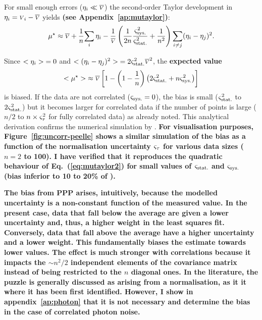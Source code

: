 \documentclass{pasa}
\def\correction#1{{\bfseries #1}}
\begin{document}
For small enough errors ($\eta_i \ll \overline{{\scriptstyle V}}$) the second-order Taylor development in $\eta_i = {\scriptstyle V}_i - \overline{{\scriptstyle V}}$ yields \correction{(see Appendix~\ref{ap:mutaylor})}: 
\begin{equation}
    \mu^\star \approx 
        \overline{{\scriptstyle V}}
      + \frac1n {\sum\limits_i \eta_i}
      - \frac 1{\overline{{\scriptstyle V}}} 
        \left(\frac1{2n}\frac{\varsigma_\text{sys.}^2}{\varsigma_\text{stat.}^2}  + \frac 1{n^2}\right) 
      \sum\limits_{i\ne j} (\eta_i-\eta_j)^2.
    \label{eq:mutaylor}
\end{equation}

Since $ {<\eta_i>}  = 0$ and $ {<(\eta_i-\eta_j)^2>}  = 2\varsigma_\text{stat.}^2\overline{{\scriptstyle V}}^2$, the \correction{expected value}
\begin{equation}
     {<\ensuremath{\mu}^\star>}   \approx \overline{{\scriptstyle V}} 
            \left[ 1 -  
               \left(1-\frac1n\right)
               \left(2\varsigma_\text{stat.}^2 + n\varsigma_\text{sys.}^2\right)
               \right]
    \label{eq:mutaylor2}
\end{equation}
is biased.  If the data are not correlated ($\varsigma_\text{sys.} = 0$), the bias is small
($\varsigma_\text{stat.}^2$ to $2\varsigma_\text{stat.}^2$) but it becomes larger for correlated data if the number of points is large ($n/2$ to $n \times \varsigma_\tau^2$ for fully correlated data) as \citet{DAG94} already noted. This analytical derivation confirms the numerical simulation by \citet[][see their Fig.~4]{NEU12}. \correction{For visualisation purposes, Figure~\ref{fig:uncorr-peelle} shows a similar simulation of the bias as a function of the normalisation uncertainty $\varsigma_\tau$ for various data sizes ($n = 2$ to 100). I have verified that it reproduces the quadratic behaviour of Eq.~(\ref{eq:mutaylor2}) for small values of $\varsigma_\text{stat.}$ and $\varsigma_\text{sys.}$ (bias inferior to 10 to 20\% of \datamean).}

\correction{The bias from PPP arises, intuitively, because the modelled uncertainty is a non-constant function of the measured value. In the present case, data that fall below the average are given a lower uncertainty and, thus, a higher weight in the least squares fit. Conversely, data that fall above the average have a higher uncertainty and a lower weight. This fundamentally biases the estimate towards lower values.  The effect is much stronger with correlations because it impacts the $\sim n^2/2$ independent elements of the covariance matrix instead of being restricted to the $n$ diagonal ones.  In the literature, the puzzle is generally discussed as arising from a normalisation, as it it where it has been first identified. However, I show in appendix~\ref{ap:photon} that it is not necessary and determine the bias in the case of correlated photon noise.}
\end{document}
